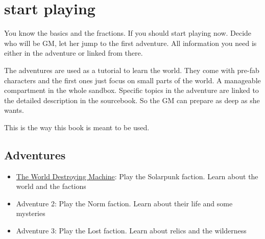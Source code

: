 \section{start playing}

You know the basics and the fractions. If you should start playing now. Decide who will be GM, let her jump to the first adventure.
All information you need is either in the adventure or linked from there.

The adventures are used as a tutorial to learn the world. They come with pre-fab characters and the first ones just focus on small parts of the world. A manageable compartment in the whole sandbox.
Specific topics in the adventure are linked to the detailed description in the sourcebook. So the GM can prepare as deep as she wants.

This is the way this book is meant to be used.

\subsection{Adventures}

\begin{itemize}
\item \hyperref[ch:the world destroying machine]{The World Destroying Machine}: Play the Solarpunk faction. Learn about the world and the factions
\item Adventure 2: Play the Norm faction. Learn about their life and some mysteries
\item Adventure 3: Play the Lost faction. Learn about relics and the wilderness
\end{itemize}